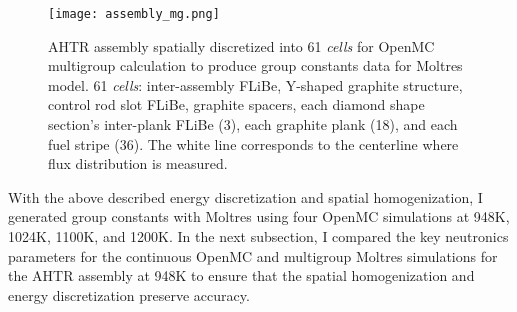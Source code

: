 \begin{figure}[htbp]
    \centering
    \texttt{[image: assembly\_mg.png]}
    \raggedright
    \caption{\acrfull{AHTR} assembly spatially discretized into 
    61 \textit{cells} for OpenMC multigroup calculation to produce group constants 
    data for Moltres model.
    61 \textit{cells}: inter-assembly \gls{FLiBe}, Y-shaped graphite structure, control 
    rod slot \gls{FLiBe}, graphite spacers, each diamond shape section's inter-plank 
    \gls{FLiBe} (3), each graphite plank (18), and each fuel stripe (36).
     The white line corresponds to the centerline where flux distribution is measured.}
    \label{fig:assembly_mg}
\end{figure}

With the above described energy discretization and spatial homogenization, I generated 
group constants with Moltres using four OpenMC simulations at 948K, 1024K, 1100K, and 
1200K.
In the next subsection, I compared the key neutronics parameters for the continuous 
OpenMC and multigroup Moltres simulations for the \gls{AHTR} assembly at 948K to 
ensure that the spatial homogenization and energy discretization preserve accuracy. 

